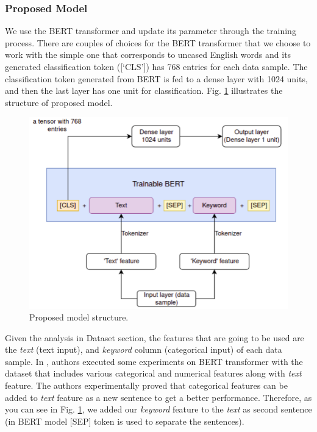 \documentclass[sigconf]{acmart}
\begin{document}
\subsubsection{Proposed Model}
We use the BERT transformer and update its parameter through the training process. There are couples of choices for the BERT transformer that we choose to work with the simple one that corresponds to uncased English words and its generated classification token ([‘CLS’]) has 768 entries for each data sample. The classification token generated from BERT is fed to a dense layer with 1024 units, and then the last layer has one unit for classification. Fig. \ref{fig:model} illustrates the structure of proposed model. 
\begin{figure}[h]
  \centering
  \includegraphics[width=\linewidth]{model.png}
  \caption{Proposed model structure.}
  \label{fig:model}
\end{figure}
Given the analysis in Dataset section, the features that are going to be used are the \textit{text} (text input), and \textit{keyword} column (categorical input) of each data sample. In \cite{gu2021package}, authors executed some experiments on BERT transformer with the dataset that includes various categorical and numerical features along with \textit{text} feature. The authors experimentally proved that categorical features can be added to \textit{text} feature as a new sentence to get a better performance. Therefore, as you can see in Fig. \ref{fig:model}, we added our \textit{keyword} feature to the \textit{text} as second sentence (in BERT model [SEP] token is used to separate the sentences). 
\end{document}
